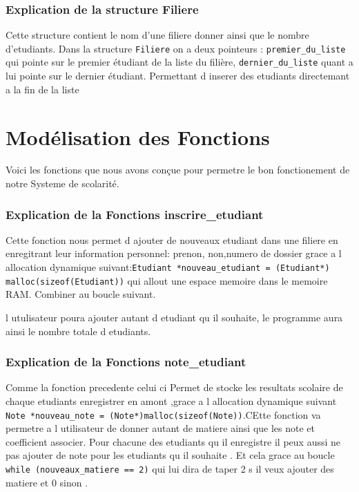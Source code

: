 \documentclass[12pt,a4paper]{article}
\begin{document}


\subsubsection{Explication de la structure Filiere}
Cette structure contient le nom d'une filiere donner ainsi que le nombre d'etudiants.
Dans la structure \texttt{Filiere} on a deux pointeurs : \texttt{premier\_du\_liste} qui pointe sur le premier étudiant 
de la liste du filière, \texttt{dernier\_du\_liste} quant a lui pointe sur le dernier étudiant. Permettant d inserer des
etudiants directemant a la fin de la liste 

\section{Modélisation des Fonctions}
Voici les fonctions que nous avons conçue pour permetre le bon fonctionement de notre Systeme de scolarité.



\subsubsection{Explication de la Fonctions inscrire\_etudiant}
Cette fonction nous permet d ajouter de nouveaux etudiant dans une filiere en enregitrant leur information personnel: prenon, non,numero de dossier  
grace a l allocation dynamique suivant:\texttt{Etudiant *nouveau\_etudiant = (Etudiant*) malloc(sizeof(Etudiant))} qui allout une espace memoire dans le memoire RAM.
Combiner au boucle suivant.

l utulisateur poura ajouter autant d etudiant qu il souhaite, le programme aura ainsi le nombre totale d etudiants.





\subsubsection{Explication de la Fonctions note\_etudiant}
Comme la fonction precedente celui ci Permet de stocke les resultats scolaire de chaque etudiants enregistrer en amont ,grace a l allocation dynamique suivant
\texttt{ Note *nouveau\_note = (Note*)malloc(sizeof(Note))}.CEtte fonction va permetre a l utilisateur de donner autant de matiere ainsi que les note et coefficient associer.
Pour chacune des etudiants qu il enregistre il peux aussi ne pas ajouter de note pour les etudiants qu il souhaite . Et cela grace au boucle \texttt{ while (nouveaux\_matiere == 2)}
qui lui dira de taper 2 s il veux ajouter des matiere et 0 sinon .
\end{document}

